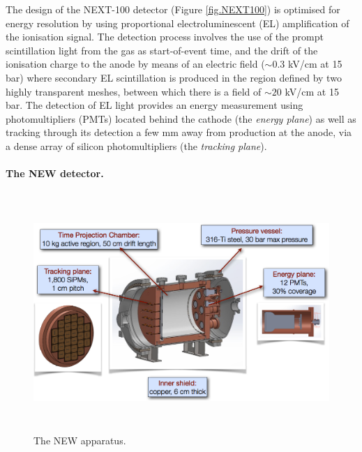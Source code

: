 The design of the NEXT-100 detector (Figure \ref{fig.NEXT100}) is optimised for energy resolution by using proportional electroluminescent (EL) amplification of the ionisation signal. The detection process involves the use of the prompt scintillation light from the gas as start-of-event time, and the drift of the ionisation charge to the anode by means of an electric field ($\sim0.3$ kV/cm at 15 bar) where secondary EL scintillation is produced in the region defined by two highly transparent meshes, between which there is a field of $\sim20$ kV/cm at 15 bar. The detection of EL light provides an energy measurement using photomultipliers (PMTs) located behind the cathode (the \emph{energy plane}) as well as tracking through its detection a few mm away from production at the anode, via a dense array of silicon photomultipliers (the \emph{tracking plane}).

\paragraph{\label{sec.new}The NEW detector.}

\begin{figure}
\centering
\includegraphics[height=9cm]{img/NEW.png}
\caption{The NEW apparatus.} \label{fig:NEW}
\end{figure} 

